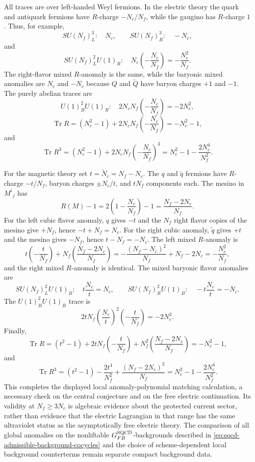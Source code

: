 All traces are over left-handed Weyl fermions.  In the electric theory the
quark and antiquark fermions have \(R\)-charge \(-N_c/N_f\), while the
gaugino has \(R\)-charge \(1\).  Thus, for example,
\[
  SU(N_f)_L^3:\quad N_c,
  \qquad
  SU(N_f)_R^3:\quad -N_c,
\]
and
\[
  SU(N_f)_L^2U(1)_R:
  \quad
  N_c\left(-\frac{N_c}{N_f}\right)
  =
  -\frac{N_c^2}{N_f}.
\]
The right-flavor mixed \(R\)-anomaly is the same, while the baryonic mixed
anomalies are \(N_c\) and \(-N_c\) because \(Q\) and \(\widetilde Q\) have
baryon charges \(+1\) and \(-1\).  The purely abelian traces are
\[
  U(1)_B^2U(1)_R:
  \quad
  2N_cN_f\left(-\frac{N_c}{N_f}\right)
  =
  -2N_c^2,
\]
\[
  \operatorname{Tr}R
  =
  (N_c^2-1)+2N_cN_f\left(-\frac{N_c}{N_f}\right)
  =
  -N_c^2-1,
\]
and
\[
  \operatorname{Tr}R^3
  =
  (N_c^2-1)
  +2N_cN_f\left(-\frac{N_c}{N_f}\right)^3
  =
  N_c^2-1-\frac{2N_c^4}{N_f^2}.
\]

For the magnetic theory set \(t=\widetilde N_c=N_f-N_c\).  The \(q\) and
\(\widetilde q\) fermions have \(R\)-charge \(-t/N_f\), baryon charges
\(\pm N_c/t\), and \(tN_f\) components each.  The mesino in \(M^i{}_j\) has
\[
  R(M)-1
  =
  2\left(1-\frac{N_c}{N_f}\right)-1
  =
  \frac{N_f-2N_c}{N_f}.
\]
For the left cubic flavor anomaly, \(q\) gives \(-t\) and the \(N_f\) right
flavor copies of the mesino give \(+N_f\), hence \(-t+N_f=N_c\).  For the
right cubic anomaly, \(\widetilde q\) gives \(+t\) and the mesino gives
\(-N_f\), hence \(t-N_f=-N_c\).  The left mixed \(R\)-anomaly is
\[
  t\left(-\frac{t}{N_f}\right)
  +
  N_f\left(\frac{N_f-2N_c}{N_f}\right)
  =
  -\frac{(N_f-N_c)^2}{N_f}+N_f-2N_c
  =
  -\frac{N_c^2}{N_f},
\]
and the right mixed \(R\)-anomaly is identical.  The mixed baryonic flavor
anomalies are
\[
  SU(N_f)_L^2U(1)_B:\quad
  t\frac{N_c}{t}=N_c,
  \qquad
  SU(N_f)_R^2U(1)_B:\quad
  -t\frac{N_c}{t}=-N_c .
\]
The \(U(1)_B^2U(1)_R\) trace is
\[
  2tN_f\left(\frac{N_c}{t}\right)^2
  \left(-\frac{t}{N_f}\right)
  =
  -2N_c^2 .
\]
Finally,
\[
  \operatorname{Tr}R
  =
  (t^2-1)+2tN_f\left(-\frac{t}{N_f}\right)
  +N_f^2\left(\frac{N_f-2N_c}{N_f}\right)
  =
  -N_c^2-1,
\]
and
\[
  \operatorname{Tr}R^3
  =
  (t^2-1)
  -\frac{2t^4}{N_f^2}
  +
  \frac{(N_f-2N_c)^3}{N_f}
  =
  N_c^2-1-\frac{2N_c^4}{N_f^2}.
\]
This completes the displayed local anomaly-polynomial matching calculation,
a necessary check on the central conjecture and on the free electric
continuation.  Its validity at \(N_f\ge3N_c\) is algebraic evidence about the
protected current sector, rather than evidence that the electric Lagrangian in
that range has the same ultraviolet status as the asymptotically free
electric theory.  The comparison of all global anomalies on the nonliftable
\(G_{FB}^{\rm SQCD}\)-backgrounds described in
\eqref{eq:sqcd-admissible-background-cocycles} and the choice of
scheme-dependent local background counterterms remain separate compact
background data.

